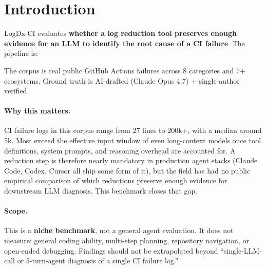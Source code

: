 \documentclass{article}
\begin{document}
\section{Introduction}

LogDx-CI evaluates \textbf{whether a log reduction tool preserves
enough evidence for an LLM to identify the root cause of a CI
failure}. The pipeline is:

\begin{center}
\end{center}

The corpus is real public GitHub Actions failures across 8 categories
and 7+ ecosystems. Ground truth is AI-drafted (Claude Opus 4.7) +
single-author verified.

\paragraph{Why this matters.} CI failure logs in this corpus range
from 27 lines to 200k+, with a median around 5k. Most exceed the
effective input window of even long-context models once tool
definitions, system prompts, and reasoning overhead are accounted
for. A reduction step is therefore nearly mandatory in production
agent stacks (Claude Code, Codex, Cursor all ship some form of it),
but the field has had no public empirical comparison of which
reductions preserve enough evidence for downstream LLM diagnosis.
This benchmark closes that gap.

\paragraph{Scope.} This is a \textbf{niche benchmark}, not a general
agent evaluation. It does not measure: general coding ability,
multi-step planning, repository navigation, or open-ended debugging.
Findings should not be extrapolated beyond ``single-LLM-call or
5-turn-agent diagnosis of a single CI failure log.''
\end{document}
